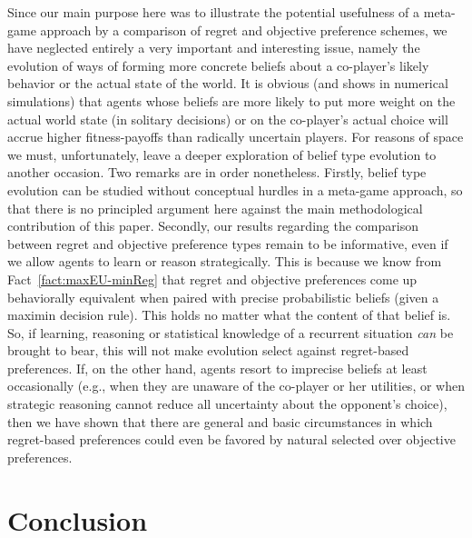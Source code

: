 \documentclass[fleqn,reqno,12pt]{article}
\theoremstyle{Satz}
\theoremstyle{Bsp}
\begin{document}
Since our main purpose here was to illustrate the potential usefulness of a meta-game approach
by a comparison of regret and objective preference schemes, we have neglected entirely a very
important and interesting issue, namely the evolution of ways of forming more concrete beliefs
about a co-player's likely behavior or the actual state of the world. It is obvious (and shows
in numerical simulations) that agents whose beliefs are more likely to put more weight on the
actual world state (in solitary decisions) or on the co-player's actual choice will accrue
higher fitness-payoffs than radically uncertain players. For reasons of space we must,
unfortunately, leave a deeper exploration of belief type evolution to another occasion. Two
remarks are in order nonetheless. Firstly, belief type evolution can be studied without
conceptual hurdles in a meta-game approach, so that there is no principled argument here
against the main methodological contribution of this paper. Secondly, our results regarding the
comparison between regret and objective preference types remain to be informative, even if we
allow agents to learn or reason strategically. This is because we know from
Fact~\ref{fact:maxEU-minReg} that regret and objective preferences come up behaviorally
equivalent when paired with precise probabilistic beliefs (given a maximin decision rule). This
holds no matter what the content of that belief is. So, if learning, reasoning or statistical
knowledge of a recurrent situation \emph{can} be brought to bear, this will not make evolution
select against regret-based preferences. If, on the other hand, agents resort to imprecise
beliefs at least occasionally (e.g., when they are unaware of the co-player or her utilities,
or when strategic reasoning cannot reduce all uncertainty about the opponent's choice), then we
have shown that there are general and basic circumstances in which regret-based preferences
could even be favored by natural selected over objective preferences.

\section{Conclusion} \label{sec:conclusion}
\end{document}
